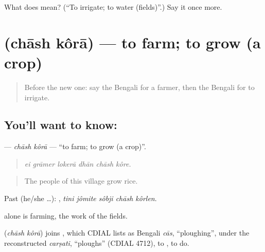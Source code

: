 \begin{tcolorbox}[breakable,colback=teal!4,colframe=teal!35!black,title={Before you move on}]
What does   mean? (\textquotedblleft{}To irrigate; to water (fields)\textquotedblright{}.) Say it once more.
\end{tcolorbox}
\section[\texorpdfstring{\bn{চাষ} \bn{করা} (chāsh kôrā)}{চাষ করা (chāsh kôrā)}]{  (chāsh kôrā) — to farm; to grow (a crop)}

\label{lesson:BN-C430-chash-kora}



\begin{quote}
Before the new one: say the Bengali for a farmer, then the Bengali for to irrigate.
\end{quote}

\subsection*{You'll want to know:  }
\textbf{ } — \emph{chāsh kôrā} — \textquotedblleft{}to farm; to grow (a crop)\textquotedblright{}.

\begin{quote}
     
\end{quote}

\begin{quote}
\emph{ei grāmer lokerā dhān chāsh kôre.}
\end{quote}

\begin{quote}
The people of this village grow rice.
\end{quote}

Past (he/she …):     , \emph{tini jômite sôbji chāsh kôrlen}.

 alone is farming, the work of the fields.

\begin{cousinweb}
\textbf{ } (\emph{chāsh kôrā}) joins , which CDIAL lists as Bengali \emph{cās}, \textquotedblleft{}ploughing\textquotedblright{}, under the reconstructed \emph{carṣati}, \textquotedblleft{}ploughs\textquotedblright{} (CDIAL 4712), to , to do.
\end{cousinweb}

